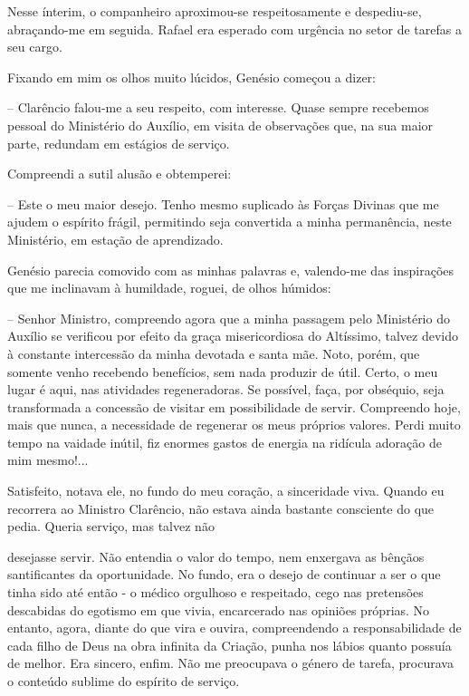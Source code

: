 \documentclass[portuguese,12pt,a4paper]{scrbook}
\begin{document}
	
	Nesse ínterim, o companheiro aproximou-se respeitosamente e despediu-se, abraçando-me em seguida. Rafael era esperado com urgência no setor de tarefas a seu cargo.
	
	Fixando em mim os olhos muito lúcidos, Genésio começou a dizer:
	
	– Clarêncio falou-me a seu respeito, com interesse. Quase sempre recebemos pessoal do Ministério do Auxílio, em visita de observações que, na sua maior parte, redundam em estágios de serviço.
	
	Compreendi a sutil alusão e obtemperei:
	
	– Este o meu maior desejo. Tenho mesmo suplicado às Forças Divinas que me ajudem o espírito frágil, permitindo seja convertida a minha permanência, neste Ministério, em estação de aprendizado.
	
	Genésio parecia comovido com as minhas palavras e, valendo-me das inspirações que me inclinavam à humildade, roguei, de olhos húmidos:
	
	– Senhor Ministro, compreendo agora que a minha passagem pelo Ministério do Auxílio se verificou por efeito da graça misericordiosa do Altíssimo, talvez devido à constante intercessão da minha devotada e santa mãe. Noto, porém, que somente venho recebendo benefícios, sem nada produzir de útil. Certo, o meu lugar é aqui, nas atividades regeneradoras. Se possível, faça, por obséquio, seja transformada a concessão de visitar em possibilidade de servir. Compreendo hoje, mais que nunca, a necessidade de regenerar os meus próprios valores. Perdi muito tempo na vaidade inútil, fiz enormes gastos de energia na ridícula adoração de mim mesmo!...
	
	Satisfeito, notava ele, no fundo do meu coração, a sinceridade viva. Quando eu recorrera ao Ministro Clarêncio, não estava ainda bastante consciente do que pedia. Queria serviço, mas talvez não
	
	
	desejasse servir. Não entendia o valor do tempo, nem enxergava as bênçãos santificantes da oportunidade. No fundo, era o desejo de continuar a ser o que tinha sido até então - o médico orgulhoso e respeitado, cego nas pretensões descabidas do egotismo em que vivia, encarcerado nas opiniões próprias. No entanto, agora, diante do que vira e ouvira, compreendendo a responsabilidade de cada filho de Deus na obra infinita da Criação, punha nos lábios quanto possuía de melhor. Era sincero, enfim. Não me preocupava o género de tarefa, procurava o conteúdo sublime do espírito de serviço.
	
\end{document}
